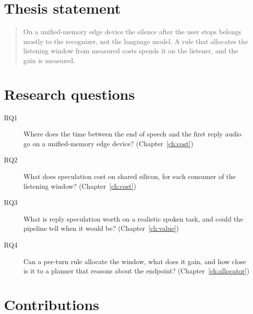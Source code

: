 \section{Thesis statement}

\begin{quote}
On a unified-memory edge device the silence after the user stops belongs
mostly to the recognizer, not the language model. A rule that allocates the
listening window from measured costs spends it on the listener, and the gain
is measured.
\end{quote}

\section{Research questions}

\begin{description}
\item[RQ1] Where does the time between the end of speech and the first reply
  audio go on a unified-memory edge device? (Chapter~\ref{ch:cost})
\item[RQ2] What does speculation cost on shared silicon, for each consumer of
  the listening window? (Chapter~\ref{ch:cost})
\item[RQ3] What is reply speculation worth on a realistic spoken task, and
  could the pipeline tell when it would be? (Chapter~\ref{ch:value})
\item[RQ4] Can a per-turn rule allocate the window, what does it gain, and how
  close is it to a planner that reasons about the endpoint?
  (Chapter~\ref{ch:allocator})
\end{description}

\section{Contributions}

